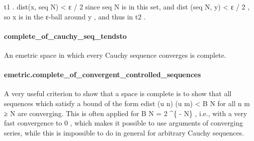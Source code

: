 \documentclass{article}
\begin{document}
\colorbox[RGB]{253,246,227}{{{{\color[RGB]{101, 123, 131} t1 }}}}.
\colorbox[RGB]{253,246,227}{{{{\color[RGB]{101, 123, 131} dist(x, seq N)  }}}{{{\color[RGB]{181, 137, 0} < }}}{{{\color[RGB]{101, 123, 131}  ε }}}{{{\color[RGB]{181, 137, 0} / }}}{{{\color[RGB]{108, 113, 196} 2 }}}} since 
\colorbox[RGB]{253,246,227}{{{{\color[RGB]{101, 123, 131} seq N }}}} is in this set, and 
\colorbox[RGB]{253,246,227}{{{{\color[RGB]{101, 123, 131} dist (seq N, y)  }}}{{{\color[RGB]{181, 137, 0} < }}}{{{\color[RGB]{101, 123, 131}  ε }}}{{{\color[RGB]{181, 137, 0} / }}}{{{\color[RGB]{108, 113, 196} 2 }}}},
so 
\colorbox[RGB]{253,246,227}{{{{\color[RGB]{101, 123, 131} x }}}} is in the ε-ball around 
\colorbox[RGB]{253,246,227}{{{{\color[RGB]{101, 123, 131} y }}}}, and thus in 
\colorbox[RGB]{253,246,227}{{{{\color[RGB]{101, 123, 131} t2 }}}}.
\paragraph{complete\_of\_cauchy\_seq\_tendsto}
\par
An emetric space in which every Cauchy sequence converges is complete.
\paragraph{emetric.complete\_of\_convergent\_controlled\_sequences}
\par
A very useful criterion to show that a space is complete is to show that all sequences
which satisfy a bound of the form 
\colorbox[RGB]{253,246,227}{{{{\color[RGB]{101, 123, 131} edist (u n) (u m)  }}}{{{\color[RGB]{181, 137, 0} < }}}{{{\color[RGB]{101, 123, 131}  B N }}}} for all 
\colorbox[RGB]{253,246,227}{{{{\color[RGB]{101, 123, 131} n m  }}}{{{\color[RGB]{181, 137, 0} ≥ }}}{{{\color[RGB]{101, 123, 131}  N }}}} are
converging. This is often applied for 
\colorbox[RGB]{253,246,227}{{{{\color[RGB]{101, 123, 131} B N  }}}{{{\color[RGB]{181, 137, 0} = }}}{{{\color[RGB]{101, 123, 131}   }}}{{{\color[RGB]{108, 113, 196} 2 }}}{{{\color[RGB]{101, 123, 131} \textasciicircum{}\{ }}}{{{\color[RGB]{181, 137, 0} - }}}{{{\color[RGB]{101, 123, 131} N\} }}}}, i.e., with a very fast convergence to
\colorbox[RGB]{253,246,227}{{{{\color[RGB]{108, 113, 196} 0 }}}}, which makes it possible to use arguments of converging series, while this is impossible
to do in general for arbitrary Cauchy sequences.
\end{document}
